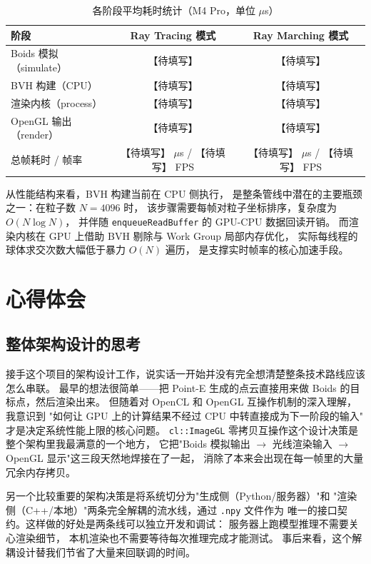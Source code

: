 \begin{table}[htbp]
  \centering
  \caption{各阶段平均耗时统计（M4 Pro，单位 $\mu$s）}
  \label{tab:perf}
  \begin{tabular}{lcc}
    \hline
    \textbf{阶段} & \textbf{Ray Tracing 模式} & \textbf{Ray Marching 模式} \\
    \hline
    Boids 模拟（simulate）   & 【待填写】 & 【待填写】 \\
    BVH 构建（CPU）          & 【待填写】 & 【待填写】 \\
    渲染内核（process）      & 【待填写】 & 【待填写】 \\
    OpenGL 输出（render）    & 【待填写】 & 【待填写】 \\
    总帧耗时 / 帧率           & 【待填写】 $\mu$s / 【待填写】 FPS
                             & 【待填写】 $\mu$s / 【待填写】 FPS \\
    \hline
  \end{tabular}
\end{table}

从性能结构来看，BVH 构建当前在 CPU 侧执行，
是整条管线中潜在的主要瓶颈之一：在粒子数 $N=4096$ 时，
该步骤需要每帧对粒子坐标排序，复杂度为 $O(N\log N)$，
并伴随 \texttt{enqueueReadBuffer} 的 GPU-CPU 数据回读开销。
而渲染内核在 GPU 上借助 BVH 剔除与 Work Group 局部内存优化，
实际每线程的球体求交次数大幅低于暴力 $O(N)$ 遍历，
是支撑实时帧率的核心加速手段。


\section{心得体会}
\label{sec:reflection}

\subsection{整体架构设计的思考}

接手这个项目的架构设计工作，说实话一开始并没有完全想清楚整条技术路线应该怎么串联。
最早的想法很简单——把 Point-E 生成的点云直接用来做 Boids 的目标点，然后渲染出来。
但随着对 OpenCL 和 OpenGL 互操作机制的深入理解，我意识到
"如何让 GPU 上的计算结果不经过 CPU 中转直接成为下一阶段的输入"
才是决定系统性能上限的核心问题。
\texttt{cl::ImageGL} 零拷贝互操作这个设计决策是整个架构里我最满意的一个地方，
它把"Boids 模拟输出 $\to$ 光线渲染输入 $\to$ OpenGL 显示"这三段天然地焊接在了一起，
消除了本来会出现在每一帧里的大量冗余内存拷贝。

另一个比较重要的架构决策是将系统切分为"生成侧（Python/服务器）"和
"渲染侧（C++/本地）"两条完全解耦的流水线，通过 \texttt{.npy} 文件作为
唯一的接口契约。这样做的好处是两条线可以独立开发和调试：
服务器上跑模型推理不需要关心渲染细节，
本机渲染也不需要等待每次推理完成才能测试。
事后来看，这个解耦设计替我们节省了大量来回联调的时间。

